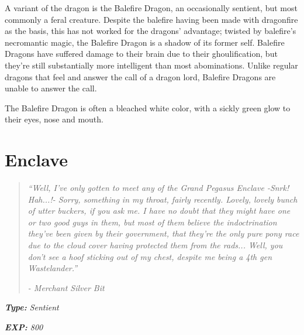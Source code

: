 \documentclass[11pt,a4paper,twocolumn]{book}
\begin{document}
	\bigskip
	
	A variant of the dragon is the Balefire Dragon, an occasionally sentient, but most commonly a feral creature. Despite the balefire having been made with dragonfire as the basis, this has not worked for the dragons' advantage; twisted by balefire's necromantic magic, the Balefire Dragon is a shadow of its former self. Balefire Dragons have suffered damage to their brain due to their ghoulification, but they're still substantially more intelligent than most abominations. Unlike regular dragons that feel and answer the call of a dragon lord, Balefire Dragons are unable to answer the call.
	
	The Balefire Dragon is often a bleached white color, with a sickly green glow to their eyes, nose and mouth.
	
	\clearpage
	
	\section*{Enclave}
	\begin{quote}
		\emph{``Well, I've only gotten to meet any of the Grand Pegasus Enclave -Snrk! Hah...!- Sorry, something in my throat, fairly recently. Lovely, lovely bunch of utter buckers, if you ask me. I have no doubt that they might have one or two good guys in them, but most of them believe the indoctrination they've been given by their government, that they're the only pure pony race due to the cloud cover having protected them from the rads... Well, you don't see  a hoof sticking out of my chest, despite me being a 4th gen Wastelander.''}
		
		\emph{-	Merchant Silver Bit}
	\end{quote}

	\noindent
	\emph{\textbf{Type:} Sentient}
	
	\noindent
	\emph{\textbf{EXP:} 800}
	
%		
%	
%		
\end{document}
